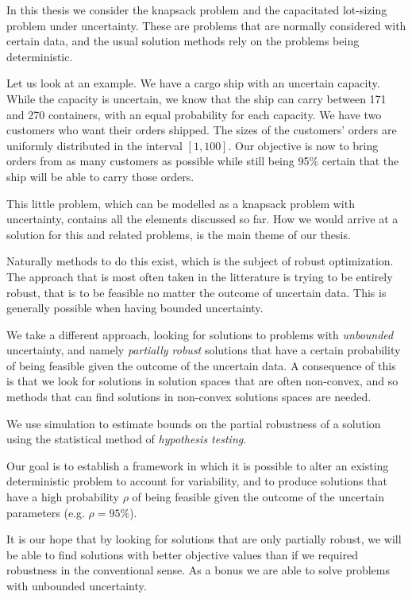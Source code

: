 In this thesis we consider the knapsack problem and the capacitated
lot-sizing problem under uncertainty. These are problems that are
normally considered with certain data, and the usual solution methods
rely on the problems being deterministic.

Let us look at an example. We have a cargo ship with an uncertain
capacity. While the capacity is uncertain, we know that the ship can
carry between 171 and 270 containers, with an equal probability for
each capacity. We have two customers who want their orders
shipped. The sizes of the customers' orders are uniformly distributed
in the interval $[1,100]$. Our objective is now to bring orders from as many customers
as possible while still being 95$\%$ certain that the ship will be
able to carry those orders.

This little problem, which can be modelled as a knapsack problem with
uncertainty, contains all the elements discussed so far. How we would
arrive at a solution for this and related problems, is the main theme
of our thesis.

Naturally methods to do this exist, which is the subject of robust
optimization. The approach that is most often taken in the litterature
is trying to be entirely robust, that is to be feasible no matter the
outcome of uncertain data. This is generally possible when having
bounded uncertainty.

We take a different approach, looking for solutions to problems with
 \emph{unbounded} uncertainty, and namely \emph{partially robust}
 solutions that have a certain probability of being feasible given the
 outcome of the uncertain data. A consequence of this is that we look
 for solutions in solution spaces that are often non-convex, and so
 methods that can find solutions in non-convex solutions spaces are
 needed.

We use simulation to estimate bounds on the partial robustness of a
solution using the statistical method of \emph{hypothesis testing}.

Our goal is to establish a framework in which it is possible to alter
an existing deterministic problem to account for variability, and to
produce solutions that have a high probability $\rho$ of being feasible
given the outcome of the uncertain parameters (e.g. $\rho = 95\%$).

It is our hope that by looking for solutions that are only partially
robust, we will be able to find solutions with better objective values
than if we required robustness in the conventional sense. As a bonus
we are able to solve problems with unbounded uncertainty.

